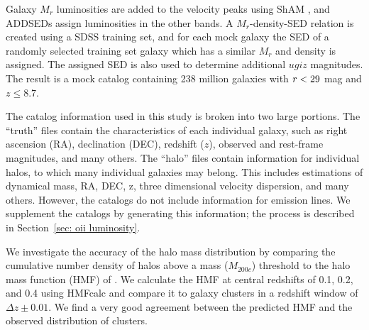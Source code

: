 \documentclass[fleqn,usenatbib]{mnras}
\begin{document}
Galaxy $M_r$ luminosities are added to the velocity peaks using ShAM \citep{Reddick2013}, and ADDSEDs assign luminosities in the other bands. A $M_r$-density-SED relation is created using a SDSS training set, and for each mock galaxy the SED of a randomly selected training set galaxy which has a similar $M_r$ and density is assigned. The assigned SED is also used to determine additional $ugiz$ magnitudes. The result is a mock catalog containing 238 million galaxies with $\hbox{$r$} < 29$ mag and $z \leq 8.7$.

The catalog information used in this study is broken into two large portions. The ``truth'' files contain the characteristics of each individual galaxy, such as right ascension (RA), declination (DEC), redshift ($z$), observed and rest-frame magnitudes, and many others. The ``halo'' files contain information for individual halos, to which many individual galaxies may belong. This includes estimations of dynamical mass, RA, DEC, z, three dimensional velocity dispersion, and many others. However, the catalogs do not include information for emission lines. We supplement the catalogs by generating this information; the process is described in Section~\ref{sec: oii luminosity}.


We investigate the accuracy of the halo mass distribution by comparing the cumulative number density of halos above a mass ($M_{200c}$) threshold to the halo mass function (HMF) of \cite{Tinker2008}. We calculate the HMF at central redshifts of 0.1, 0.2, and 0.4 using {\sc HMFcalc} \citep{Murray2013} and compare it to galaxy clusters in a redshift window of $\Delta z\pm0.01$. We find a very good agreement between the predicted HMF and the observed distribution of clusters.
\end{document}
